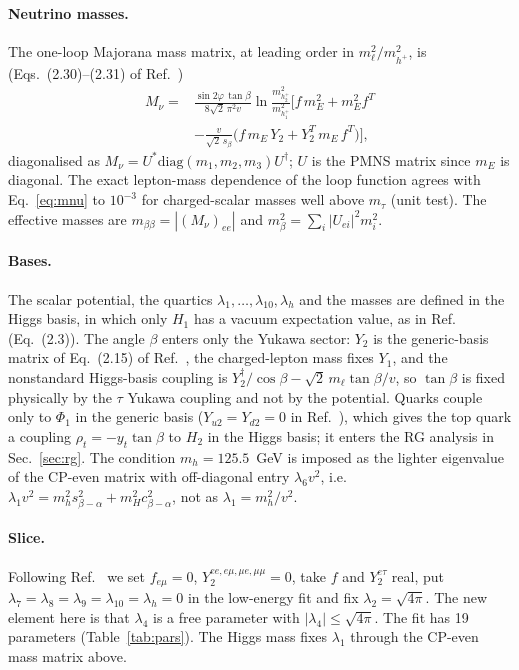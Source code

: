\documentclass[twocolumn,epjc3]{svjour3}
\newcommand{\HG}{Ref.~\cite{HerreroGarcia:2017xdq}}
\begin{document}
\paragraph{Neutrino masses.} The one-loop Majorana mass matrix, at leading order in $m_\ell^2/m_{h^+}^2$, is (Eqs.~(2.30)--(2.31) of \HG{})
\begin{align}
M_\nu={}&\frac{\sin2\varphi\,\tan\beta}{8\sqrt2\,\pi^2 v}\ln\frac{m^2_{h_2^+}}{m^2_{h_1^+}}\Big[f\,m_E^2+m_E^2f^T\nonumber\\
&-\frac{v}{\sqrt2\,s_\beta}\big(f\,m_E\,Y_2+Y_2^T\,m_E\,f^T\big)\Big],
\label{eq:mnu}
\end{align}
diagonalised as $M_\nu=U^*\mathrm{diag}(m_1,m_2,m_3)U^\dagger$; $U$ is the PMNS matrix since $m_E$ is diagonal. The exact lepton-mass dependence of the loop function agrees with Eq.~\eqref{eq:mnu} to $10^{-3}$ for charged-scalar masses well above $m_\tau$ (unit test). The effective masses are $m_{\beta\beta}=|(M_\nu)_{ee}|$ and $m_\beta^2=\sum_i|U_{ei}|^2m_i^2$.

\paragraph{Bases.} The scalar potential, the quartics $\lambda_1,\dots,\lambda_{10},\lambda_h$ and the masses are defined in the Higgs basis, in which only $H_1$ has a vacuum expectation value, as in \HG{} (Eq.~(2.3)). The angle $\beta$ enters only the Yukawa sector: $Y_2$ is the generic-basis matrix of Eq.~(2.15) of \HG{}, the charged-lepton mass fixes $Y_1$, and the nonstandard Higgs-basis coupling is $Y_2^\dagger/\cos\beta-\sqrt2\,m_\ell\tan\beta/v$, so $\tan\beta$ is fixed physically by the $\tau$ Yukawa coupling and not by the potential. Quarks couple only to $\Phi_1$ in the generic basis ($Y_{u2}=Y_{d2}=0$ in \HG{}), which gives the top quark a coupling $\rho_t=-y_t\tan\beta$ to $H_2$ in the Higgs basis; it enters the RG analysis in Sec.~\ref{sec:rg}. The condition $m_h=125.5$~GeV is imposed as the lighter eigenvalue of the CP-even matrix with off-diagonal entry $\lambda_6v^2$, i.e.\ $\lambda_1v^2=m_h^2s_{\beta-\alpha}^2+m_H^2c_{\beta-\alpha}^2$, not as $\lambda_1=m_h^2/v^2$.

\paragraph{Slice.} Following \HG{} we set $f_{e\mu}=0$, $Y_2^{ee,e\mu,\mu e,\mu\mu}=0$, take $f$ and $Y_2^{e\tau}$ real, put $\lambda_7=\lambda_8=\lambda_9=\lambda_{10}=\lambda_h=0$ in the low-energy fit and fix $\lambda_2=\sqrt{4\pi}$. The new element here is that $\lambda_4$ is a free parameter with $|\lambda_4|\le\sqrt{4\pi}$. The fit has 19 parameters (Table~\ref{tab:pars}). The Higgs mass fixes $\lambda_1$ through the CP-even mass matrix above.
\end{document}

